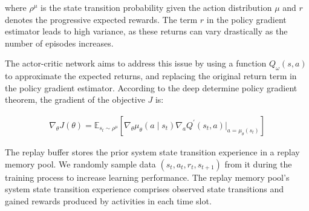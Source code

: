 \documentclass[10pt, conference, letterpaper]{IEEEtran}
\begin{document}

where $\rho^{\mu}$ is the state transition probability given the action distribution $\mu$ and $r$ denotes the progressive expected rewards. The term $r$ in the policy gradient estimator leads to high variance, as these returns can vary drastically as the number of episodes increases.

The actor-critic network aims to address this issue by using a function $Q_{\omega}(s, a)$ to approximate the expected returns, and replacing the original return term in the policy gradient estimator. According to the deep determine policy gradient theorem, the gradient of the objective $J$ is:

\begin{equation}
\begin{aligned}
\nabla_{\theta} J(\theta)=\mathbb{E}_{s_t \sim \rho^{\mu}}\left[\nabla_{\theta} \mu_{\theta}(a \mid s_t) \nabla_{a} Q^{\prime}(s_t, a)|_{a=\mu_{\theta}(s_t)} \right]
\end{aligned}
\end{equation}


The replay buffer stores the prior system state transition experience in a replay memory pool. We randomly sample data $(s_t, a_t, r_t, s_{t+1})$ from it during the training process to increase learning performance. The replay memory pool's system state transition experience comprises observed state transitions and gained rewards produced by activities in each time slot.
\end{document}
